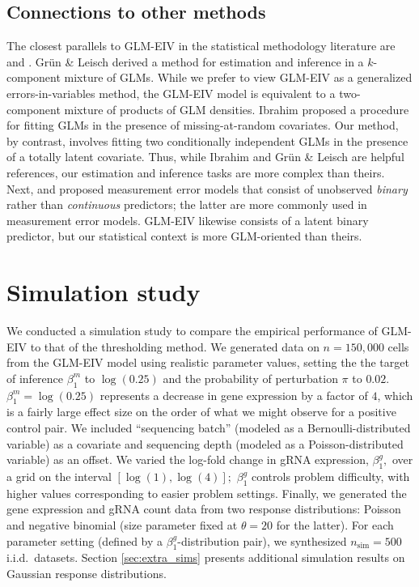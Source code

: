 \documentclass[12pt]{article}
\begin{document}
\subsection{Connections to other methods}\label{sec:statistical_lit_review}
The closest parallels to GLM-EIV in the statistical methodology literature are \parencite{Grun2008} and \parencite{Ibrahim1990}. Gr\"{u}n \& Leisch derived a method for estimation and inference in a $k$-component mixture of GLMs. While we prefer to view GLM-EIV as a generalized errors-in-variables method,  the GLM-EIV model is equivalent to a two-component mixture of products of GLM densities. Ibrahim proposed a procedure for fitting GLMs in the presence of missing-at-random covariates. Our method, by contrast, involves fitting two conditionally independent GLMs in the presence of a totally latent covariate. Thus, while Ibrahim and Gr\"{u}n \& Leisch are helpful references, our estimation and inference tasks are more complex than theirs. Next, \parencite{Aigner1973} and \parencite{Savoca2000} proposed measurement error models that consist of unobserved \textit{binary} rather than \textit{continuous} predictors; the latter are more commonly used in measurement error models. GLM-EIV likewise consists of a latent binary predictor, but our statistical context is more GLM-oriented than theirs.

\section{Simulation study}\label{sec:simulation}

We conducted a simulation study to compare the empirical performance of GLM-EIV to that of the thresholding method. We generated data on $n = 150,000$ cells from the GLM-EIV model using realistic parameter values, setting the the target of inference $\beta^m_1$ to $\log(0.25)$ and the probability of perturbation $\pi$ to $0.02$. $\beta^m_1 = \log(0.25)$ represents a decrease in gene expression by a factor of $4$, which is a fairly large effect size on the order of what we might observe for a positive control pair. We included ``sequencing batch'' (modeled as a Bernoulli-distributed variable) as a covariate and sequencing depth (modeled as a Poisson-distributed variable) as an offset. We varied the log-fold change in gRNA expression, $\beta^g_1,$ over a grid on the interval $[\log(1), \log(4)];$ $\beta^g_1$ controls problem difficulty, with higher values corresponding to easier problem settings. Finally, we generated the gene expression and gRNA count data from two response distributions: Poisson and negative binomial (size parameter fixed at $\theta = 20$ for the latter). For each parameter setting (defined by a $\beta^g_1$-distribution pair), we synthesized $n_\textrm{sim} = 500$ i.i.d.\ datasets. Section \ref{sec:extra_sims} presents additional simulation results on Gaussian response distributions.
\end{document}
